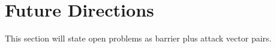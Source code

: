 \section{Future Directions}

This section will state open problems as barrier plus attack vector pairs.

